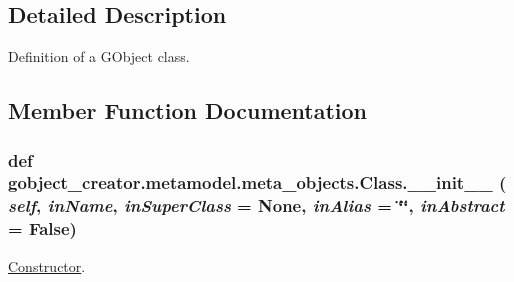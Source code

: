 \subsection{Detailed Description}
Definition of a GObject class. 

\subsection{Member Function Documentation}
\hypertarget{classgobject__creator_1_1metamodel_1_1meta__objects_1_1Class_a092944121e38ebabf41c0780ecae56b9}{
\subsubsection[{\_\-\_\-init\_\-\_\-}]{\setlength{\rightskip}{0pt plus 5cm}def gobject\_\-creator.metamodel.meta\_\-objects.Class.\_\-\_\-init\_\-\_\- ( {\em self}, \/   {\em inName}, \/   {\em inSuperClass} = {\ttfamily None}, \/   {\em inAlias} = {\ttfamily \char`\"{}\char`\"{}}, \/   {\em inAbstract} = {\ttfamily False})}}
\label{classgobject__creator_1_1metamodel_1_1meta__objects_1_1Class_a092944121e38ebabf41c0780ecae56b9}


\hyperlink{classgobject__creator_1_1metamodel_1_1meta__objects_1_1Constructor}{Constructor}. 


